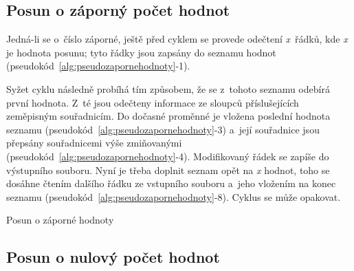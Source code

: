\subsection{Posun o záporný počet hodnot}
\label{zapornehodnoty}

Jedná-li se o~číslo záporné, ještě před cyklem se provede odečtení \textit{x}~řádků,
kde \textit{x} je hodnota posunu; tyto řádky jsou zapsány do seznamu hodnot
(pseudokód~\ref{alg:pseudozapornehodnoty}-1).

Syžet cyklu následně probíhá
tím způsobem, že se z~tohoto seznamu odebírá první hodnota. Z~té jsou odečteny informace ze
sloupců příslušejících zeměpisným souřadnicím. Do dočasné proměnné je vložena poslední
hodnota seznamu (pseudokód~\ref{alg:pseudozapornehodnoty}-3)
a~její souřadnice jsou pře\-psány souřadnicemi výše zmiňovanými
(pseudokód~\ref{alg:pseudozapornehodnoty}-4). Modifikovaný řádek
se zapíše do výstupního souboru. Nyní je třeba doplnit seznam opět na \textit{x} hodnot, toho
se dosáhne čtením dalšího řádku ze vstupního souboru a~jeho vložením na konec seznamu
(pseudokód~\ref{alg:pseudozapornehodnoty}-8). Cyklus
se může opakovat. 

\begin{algorithm}
\caption{Posun o záporné hodnoty}
\label{alg:pseudozapornehodnoty}
    \begin{algorithmic}[1]
\end{algorithmic}
\end{algorithm}

\begin{algorithm}                     
\begin{algorithmic} [1]
    \ENDWHILE
    \end{algorithmic}
\end{algorithm}

\subsection{Posun o nulový počet hodnot}
\label{nulovehodnoty}

